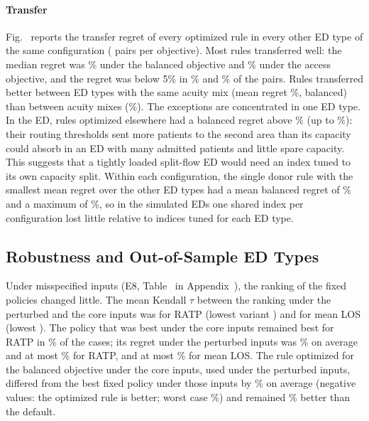 \paragraph*{Transfer} Fig.~ reports the transfer regret of every optimized rule in every other ED type of the same configuration (\TransferBalancedNPairs{} pairs per objective). Most rules transferred well: the median regret was \TransferBalancedMedian\% under the balanced objective and \TransferAccessMedian\% under the access objective, and the regret was below 5\% in \TransferBalancedShareUnderFive\% and \TransferAccessShareUnderFive\% of the pairs. Rules transferred better between ED types with the same acuity mix (mean regret \TransferBalancedSameAcuity\%, balanced) than between acuity mixes (\TransferBalancedOtherAcuity\%). The exceptions are concentrated in one ED type. In the \TransferBalancedWorstTarget{} ED, \TransferBalancedNOverFiftyWorstTarget{} rules optimized elsewhere had a balanced regret above \TransferBigRegret\% (up to \TransferBalancedMax\%): their routing thresholds sent more patients to the second area than its capacity could absorb in an ED with many admitted patients and little spare capacity. This suggests that a tightly loaded split-flow ED would need an index tuned to its own capacity split. Within each configuration, the single donor rule with the smallest mean regret over the other ED types had a mean balanced regret of \TransferBalancedDonorMean\% and a maximum of \TransferBalancedDonorMax\%, so in the simulated EDs one shared index per configuration lost little relative to indices tuned for each ED type.

\subsection{Robustness and Out-of-Sample ED Types}
\label{sec:res:robust}

Under misspecified inputs (E8, Table~ in Appendix~), the ranking of the fixed policies changed little. The mean Kendall $\tau$ between the ranking under the perturbed and the core inputs was \RobTauRatpMean{} for RATP (lowest variant \RobTauRatpMin) and \RobTauLosMean{} for mean LOS (lowest \RobTauLosMin). The policy that was best under the core inputs remained best for RATP in \RobSameBestRatp\% of the cases; its regret under the perturbed inputs was \RobRegretRatpMean\% on average and at most \RobRegretRatpMax\% for RATP, and at most \RobRegretLosMax\% for mean LOS. The rule optimized for the balanced objective under the core inputs, used under the perturbed inputs, differed from the best fixed policy under those inputs by \RobOptVsBestMean\% on average (negative values: the optimized rule is better; worst case \RobOptVsBestMax\%) and remained \RobOptGainDefaultMean\% better than the default.

